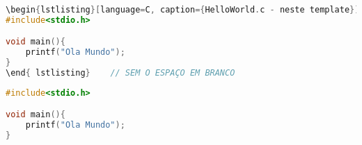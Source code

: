 \begin{lstlisting}[language=C, caption={HelloWorld.c - neste template}]
\begin{lstlisting}[language=C, caption={HelloWorld.c - neste template}]
#include<stdio.h>

void main(){
    printf("Ola Mundo");
}
\end{ lstlisting}    // SEM O ESPAÇO EM BRANCO
\end{lstlisting}

\begin{lstlisting}[language=C, caption={HelloWorld.c - Como aparecerá}]
#include<stdio.h>

void main(){
    printf("Ola Mundo");
}
\end{lstlisting}